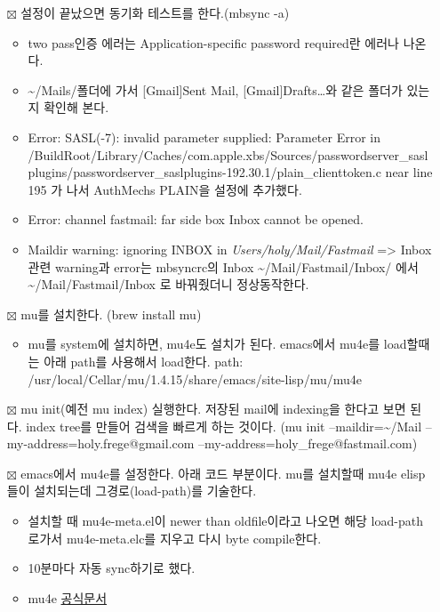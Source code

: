 \documentclass[11pt]{article}
\begin{document}
\begin{itemize}
\item[{$\boxtimes$}] 설정이 끝났으면 동기화 테스트를 한다.(mbsync -a)
\begin{itemize}
\item two pass인증 에러는 Application-specific password required란 에러나 나온다.
\item \textasciitilde{}/Mails/폴더에 가서 [Gmail]Sent Mail, [Gmail]Drafts\ldots{}와 같은 폴더가 있는지 확인해 본다.
\item Error: SASL(-7): invalid parameter supplied: Parameter Error in /BuildRoot/Library/Caches/com.apple.xbs/Sources/passwordserver\_saslplugins/passwordserver\_saslplugins-192.30.1/plain\_clienttoken.c near line 195 가 나서 AuthMechs PLAIN을 설정에 추가했다.
\item Error: channel fastmail: far side box Inbox cannot be opened.
\item Maildir warning: ignoring INBOX in \emph{Users/holy/Mail/Fastmail}
=> Inbox관련 warning과 error는 mbsyncrc의 Inbox \textasciitilde{}/Mail/Fastmail/Inbox/ 에서  \textasciitilde{}/Mail/Fastmail/Inbox 로 바꿔줬더니 정상동작한다.
\end{itemize}

\item[{$\boxtimes$}] mu를 설치한다. (brew install mu)
\begin{itemize}
\item mu를 system에 설치하면, mu4e도 설치가 된다. emacs에서 mu4e를 load할때는 아래 path를 사용해서 load한다.
path: /usr/local/Cellar/mu/1.4.15/share/emacs/site-lisp/mu/mu4e
\end{itemize}

\item[{$\boxtimes$}] mu init(예전 mu index) 실행한다. 저장된 mail에 indexing을 한다고 보면 된다. index tree를 만들어 검색을 빠르게 하는 것이다.
(mu init --maildir=\textasciitilde{}/Mail --my-address=holy.frege@gmail.com --my-address=holy\_frege@fastmail.com)

\item[{$\boxtimes$}] emacs에서 mu4e를 설정한다. 아래 코드 부분이다. mu를 설치할때 mu4e elisp들이 설치되는데 그경로(load-path)를 기술한다.
\begin{itemize}
\item 설치할 때 mu4e-meta.el이 newer than oldfile이라고 나오면 해당 load-path로가서 mu4e-meta.elc를 지우고 다시 byte compile한다.
\item 10분마다 자동 sync하기로 했다.
\item mu4e \href{https://www.djcbsoftware.nl/code/mu/mu4e/index.html}{공식문서}
\end{itemize}


\end{itemize}
\end{document}
